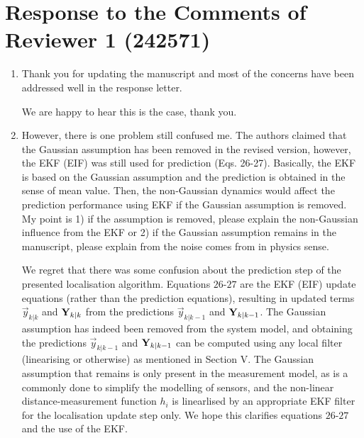 \documentclass[a4paper]{scrartcl}
\newenvironment{rebuttal}{\begin{enumerate}[label={\color{grey}\thesection.\arabic{enumi}},leftmargin=0pt,ref=\thesection.\arabic{enumi}]}{\end{enumerate}}
\newcommand{\reviewtext}[1]{{\color{nblue} #1}}
\begin{document}
\section*{Response to the Comments of Reviewer 1 (242571)}
\def\thesection{R1}
\begin{rebuttal}
\item \reviewtext{Thank you for updating the manuscript and most of the concerns have been addressed well in the response letter.}

We are happy to hear this is the case, thank you.

\item \reviewtext{However, there is one problem still confused me. The authors claimed that the Gaussian assumption has been removed in the revised version, however, the EKF (EIF) was still used for prediction (Eqs. 26-27). Basically, the EKF is based on the Gaussian assumption and the prediction is obtained in the sense of mean value. Then, the non-Gaussian dynamics would affect the prediction performance using EKF if the Gaussian assumption is removed. My point is 1) if the assumption is removed, please explain the non-Gaussian influence from the EKF or 2) if the Gaussian assumption remains in the manuscript, please explain from the noise comes from in physics sense.}

We regret that there was some confusion about the prediction step of the presented localisation algorithm. Equations $26$-$27$ are the EKF (EIF) update equations (rather than the prediction equations), resulting in updated terms $\vec{y}_{k|k}$ and ${{\mathbf{Y}}}_{k|k}$ from the predictions $\vec{y}_{k|k-1}$ and ${{\mathbf{Y}}}_{k|k-1}$. The Gaussian assumption has indeed been removed from the system model, and obtaining the predictions $\vec{y}_{k|k-1}$ and ${{\mathbf{Y}}}_{k|k-1}$ can be computed using any local filter (linearising or otherwise) as mentioned in Section V. The Gaussian assumption that remains is only present in the measurement model, as is a commonly done to simplify the modelling of sensors, and the non-linear distance-measurement function $h_i$ is linearlised by an appropriate EKF filter for the localisation update step only. We hope this clarifies equations $26$-$27$ and the use of the EKF.

\end{rebuttal}

\end{document}
